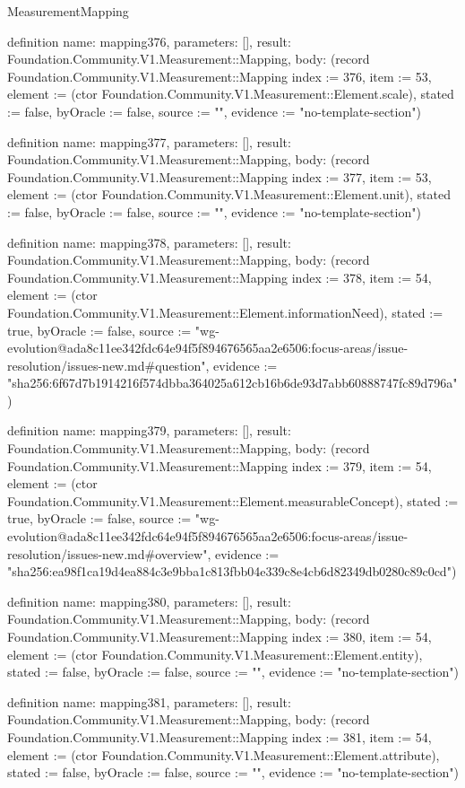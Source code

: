 \begin{lexlean}{MeasurementMapping}
\begin{semanticmodule}
definition{
  name: mapping376,
  parameters: [],
  result: Foundation.Community.V1.Measurement::Mapping,
  body: (record Foundation.Community.V1.Measurement::Mapping {index := 376, item := 53, element := (ctor Foundation.Community.V1.Measurement::Element.scale), stated := false, byOracle := false, source := "", evidence := "no-template-section"})
}

definition{
  name: mapping377,
  parameters: [],
  result: Foundation.Community.V1.Measurement::Mapping,
  body: (record Foundation.Community.V1.Measurement::Mapping {index := 377, item := 53, element := (ctor Foundation.Community.V1.Measurement::Element.unit), stated := false, byOracle := false, source := "", evidence := "no-template-section"})
}

definition{
  name: mapping378,
  parameters: [],
  result: Foundation.Community.V1.Measurement::Mapping,
  body: (record Foundation.Community.V1.Measurement::Mapping {index := 378, item := 54, element := (ctor Foundation.Community.V1.Measurement::Element.informationNeed), stated := true, byOracle := false, source := "wg-evolution@ada8c11ee342fdc64e94f5f894676565aa2e6506:focus-areas/issue-resolution/issues-new.md#question", evidence := "sha256:6f67d7b1914216f574dbba364025a612cb16b6de93d7abb60888747fc89d796a"})
}

definition{
  name: mapping379,
  parameters: [],
  result: Foundation.Community.V1.Measurement::Mapping,
  body: (record Foundation.Community.V1.Measurement::Mapping {index := 379, item := 54, element := (ctor Foundation.Community.V1.Measurement::Element.measurableConcept), stated := true, byOracle := false, source := "wg-evolution@ada8c11ee342fdc64e94f5f894676565aa2e6506:focus-areas/issue-resolution/issues-new.md#overview", evidence := "sha256:ea98f1ca19d4ea884c3e9bba1c813fbb04e339c8e4cb6d82349db0280c89c0cd"})
}

definition{
  name: mapping380,
  parameters: [],
  result: Foundation.Community.V1.Measurement::Mapping,
  body: (record Foundation.Community.V1.Measurement::Mapping {index := 380, item := 54, element := (ctor Foundation.Community.V1.Measurement::Element.entity), stated := false, byOracle := false, source := "", evidence := "no-template-section"})
}

definition{
  name: mapping381,
  parameters: [],
  result: Foundation.Community.V1.Measurement::Mapping,
  body: (record Foundation.Community.V1.Measurement::Mapping {index := 381, item := 54, element := (ctor Foundation.Community.V1.Measurement::Element.attribute), stated := false, byOracle := false, source := "", evidence := "no-template-section"})
}


\end{semanticmodule}
\end{lexlean}
